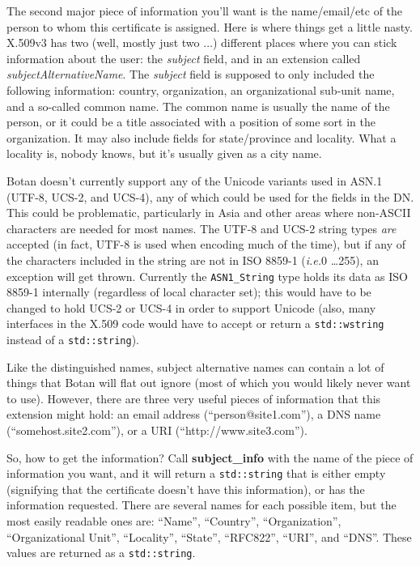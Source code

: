 \documentclass{article}
\newcommand{\function}[1]{\textbf{#1}}
\newcommand{\type}[1]{\texttt{#1}}
\newcommand{\ie}[0]{\emph{i.e.}}
\begin{document}
The second major piece of information you'll want is the
name/email/etc of the person to whom this certificate is
assigned. Here is where things get a little nasty. X.509v3 has two
(well, mostly just two $\ldots$) different places where you can stick
information about the user: the \emph{subject} field, and in an
extension called \emph{subjectAlternativeName}. The \emph{subject}
field is supposed to only included the following information: country,
organization, an organizational sub-unit name, and a so-called common
name. The common name is usually the name of the person, or it could
be a title associated with a position of some sort in the
organization. It may also include fields for state/province and
locality. What a locality is, nobody knows, but it's usually given as
a city name.

Botan doesn't currently support any of the Unicode variants used in
ASN.1 (UTF-8, UCS-2, and UCS-4), any of which could be used for the
fields in the DN. This could be problematic, particularly in Asia and
other areas where non-ASCII characters are needed for most names. The
UTF-8 and UCS-2 string types \emph{are} accepted (in fact, UTF-8 is
used when encoding much of the time), but if any of the characters
included in the string are not in ISO 8859-1 (\ie 0 \ldots 255), an
exception will get thrown. Currently the \type{ASN1\_String} type
holds its data as ISO 8859-1 internally (regardless of local character
set); this would have to be changed to hold UCS-2 or UCS-4 in order to
support Unicode (also, many interfaces in the X.509 code would have to
accept or return a \type{std::wstring} instead of a
\type{std::string}).

Like the distinguished names, subject alternative names can contain a
lot of things that Botan will flat out ignore (most of which you would
likely never want to use). However, there are three very useful pieces
of information that this extension might hold: an email address
(``person@site1.com''), a DNS name (``somehost.site2.com''), or a URI
(``http://www.site3.com'').

So, how to get the information? Call \function{subject\_info} with the
name of the piece of information you want, and it will return a
\type{std::string} that is either empty (signifying that the
certificate doesn't have this information), or has the information
requested. There are several names for each possible item, but the
most easily readable ones are: ``Name'', ``Country'',
``Organization'', ``Organizational Unit'', ``Locality'', ``State'',
``RFC822'', ``URI'', and ``DNS''. These values are returned as a
\type{std::string}.
\end{document}
